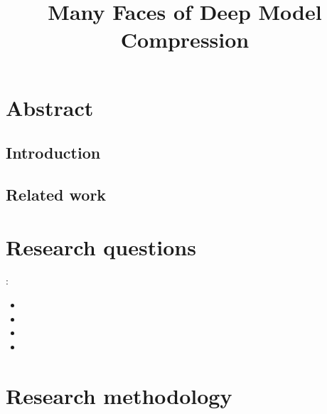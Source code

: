\documentclass{article}
\title{Many Faces of Deep Model Compression}
\begin{document}
\maketitle






\section{Abstract}
\subsection{Introduction}
\lipsum[1-3]\cite{LTH}
\subsection{Related work}
\label{challenges}
\lipsum[4-5]\cite{DualLTH}

\section{Research questions}
\lipsum[6]:
% 
\begin{itemize}
    \item \lipsum[7]
    \item \lipsum[8]
    \item \lipsum[9]
    \item \lipsum[10]
\end{itemize}

\section{Research methodology}
\lipsum[11-12]

% 


  
  
\end{document}
